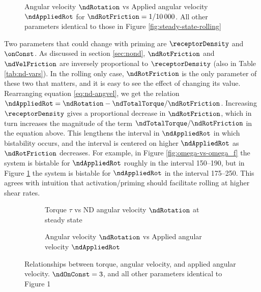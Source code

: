 \begin{figure}
  \centering

  \caption{Angular velocity $\ndRotation$ vs Applied angular velocity
    $\ndAppliedRot$ for $\ndRotFriction = 1/10\, 000$. All other
    parameters identical to those in Figure
    \ref{fig:steady-state-rolling}}
  \label{fig:rolling-large-Nt}
\end{figure}

Two parameters that could change with priming are $\receptorDensity$
and $\onConst$. As discussed in section \ref{sec:nond},
$\ndRotFriction$ and $\ndVelFriction$ are inversely proportional to
$\receptorDensity$ (also in Table \ref{tab:nd-vars}). In the rolling
only case, $\ndRotFriction$ is the only parameter of these two that
matters, and it is easy to see the effect of changing its
value. Rearranging equation \eqref{eq:nd-angvel}, we get the relation
$\ndAppliedRot = \ndRotation -
\ndTotalTorque/\ndRotFriction$. Increasing $\receptorDensity$ gives a
proportional decrease in $\ndRotFriction$, which in turn increases the
magnitude of the term $\ndTotalTorque/\ndRotFriction$ in the equation
above. This lengthens the interval in $\ndAppliedRot$ in which
bistability occurs, and the interval is centered on higher
$\ndAppliedRot$ as $\ndRotFriction$ decreases. For example, in Figure
\ref{fig:omega-vs-omega_f} the system is bistable for $\ndAppliedRot$
roughly in the interval 150--190, but in Figure
\ref{fig:rolling-large-Nt} the system is bistable for $\ndAppliedRot$
in the interval 175--250. This agrees with intuition that
activation/priming should facilitate rolling at higher shear rates.

\begin{figure}
  \centering
  \begin{subfigure}{0.45\textwidth}

    \caption{Torque $\tau$ vs ND angular velocity $\ndRotation$ at
      steady state}
    \label{fig:tau-vs-omega-kappa-large}
  \end{subfigure}
  \quad
  \begin{subfigure}{0.45\textwidth}

    \caption{Angular velocity $\ndRotation$ vs Applied angular
      velocity $\ndAppliedRot$}
    \label{fig:omega-vs-omega_f-kappa-large}
  \end{subfigure}
  \caption{Relationships between torque, angular velocity, and applied
    angular velocity. $\ndOnConst = 3$, and all other parameters
    identical to Figure 1}
  \label{fig:rolling-large-kap}
\end{figure}

